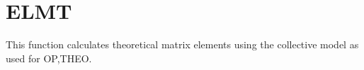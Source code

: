 \section{ELMT}
\label{sect:elmt}

\noindent This function calculates theoretical matrix elements using the
collective model as used for OP,THEO.\\
